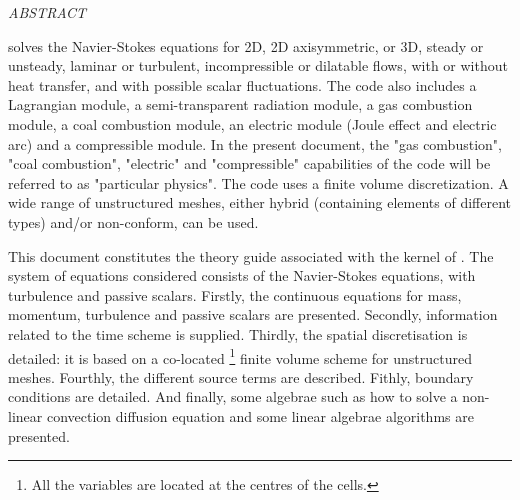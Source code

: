 
%
%
%
%


\vspace*{0.1cm}
\begin{center}
\medskip
\textit{ABSTRACT}
\end{center}
\vspace*{1cm}

\CS solves the Navier-Stokes equations for 2D, 2D axisymmetric, or 3D,
steady or unsteady, laminar or turbulent, incompressible or dilatable
flows, with or without heat transfer, and with possible scalar
fluctuations. The code also includes a Lagrangian module, a
semi-transparent radiation module, a gas combustion module, a coal
combustion module, an electric module (Joule effect and electric arc)
and a compressible module. In the present document, the "gas
combustion", "coal combustion", "electric" and "compressible"
capabilities of the code will be referred to as "particular
physics". The code uses a finite volume discretization. A wide range
of unstructured meshes, either hybrid (containing elements of
different types) and/or non-conform, can be used.

This document constitutes the theory guide
associated with the kernel of \CS.
The system of equations considered consists of the
Navier-Stokes equations, with turbulence and passive scalars. Firstly, the
continuous equations for mass, momentum, turbulence and passive scalars are
presented. Secondly, information related to the time scheme is supplied.
Thirdly, the spatial discretisation is detailed: it is based on a co-located%
\footnote{%
All the variables are located at the centres of the cells.} finite volume
scheme for unstructured meshes. Fourthly, the different source terms are
described. Fithly, boundary conditions are detailed. And finally, some algebrae
such as how to solve a non-linear convection diffusion equation and some
linear algebrae algorithms are presented.

